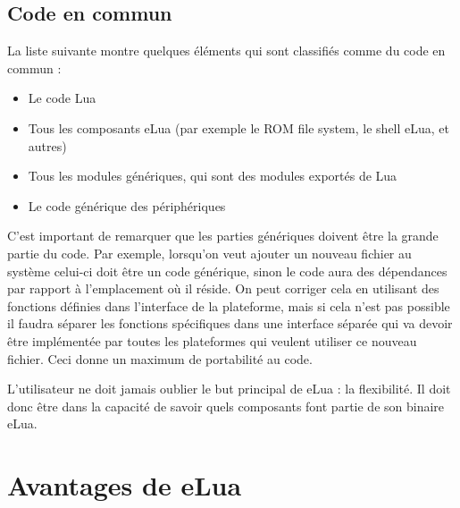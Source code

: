 \subsection{Code en commun}

La liste suivante montre quelques éléments qui sont classifiés comme du code en commun :

\begin{itemize}
 \item Le code Lua
 \item Tous les composants eLua (par exemple le ROM file system, le shell eLua, et autres)
 \item Tous les modules génériques, qui sont des modules exportés de Lua
 \item Le code générique des périphériques
\end{itemize}

C'est important de remarquer que les parties génériques doivent être la grande partie du code. Par exemple, lorsqu'on veut ajouter un nouveau fichier au système
celui-ci doit être un code générique, sinon le code aura des dépendances par rapport à l'emplacement où il réside. On peut corriger cela en utilisant des fonctions
définies dans l'interface de la plateforme, mais si cela n'est pas possible il faudra séparer les fonctions spécifiques dans une interface séparée qui va
devoir être implémentée par toutes les plateformes qui veulent utiliser ce nouveau fichier. Ceci donne un maximum de portabilité au code.

L'utilisateur ne doit jamais oublier le but principal de eLua : la flexibilité. Il doit donc être dans la capacité de savoir quels composants font partie
de son binaire eLua.

\section{Avantages de eLua}

